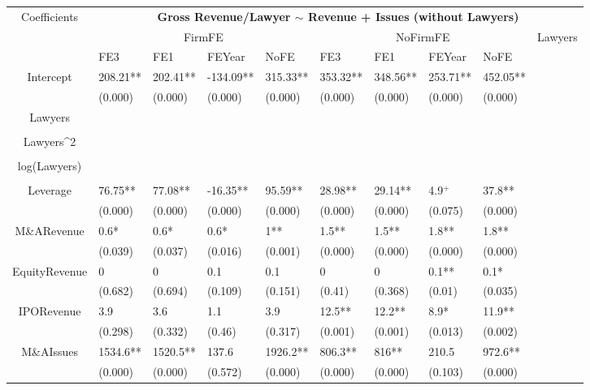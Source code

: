 \documentclass{article}
\begin{document}
\begin{table}[H]
\centering
\begin{tabular}{|clllllllll|}
\hline
\multirow{3}{*}{Coefficients} & \multicolumn{9}{c|}{\textbf{Gross Revenue/Lawyer $\sim$ Revenue + Issues (without Lawyers)}} \\
\cline{2-10}
& \multicolumn{4}{c}{FirmFE} & \multicolumn{4}{c}{NoFirmFE} & \multirow{2}{*}{Lawyers} \\
\cline{2-9}
& FE3 & FE1 & FEYear & NoFE & FE3 & FE1 & FEYear & NoFE &  \\
\hline
 
Intercept & 208.21** & 202.41** & -134.09** & 315.33** & 353.32** & 348.56** & 253.71** & 452.05** & \\ 
   & (0.000) & (0.000) & (0.000) & (0.000) & (0.000) & (0.000) & (0.000) & (0.000) & \\ 
  Lawyers &  &  &  &  &  &  &  &  & \\ 
   &  &  &  &  &  &  &  &  & \\ 
  Lawyers^2 &  &  &  &  &  &  &  &  & \\ 
   &  &  &  &  &  &  &  &  & \\ 
  log(Lawyers) &  &  &  &  &  &  &  &  & \\ 
   &  &  &  &  &  &  &  &  & \\ 
  Leverage & 76.75** & 77.08** & -16.35** & 95.59** & 28.98** & 29.14** & 4.9$^{+}$ & 37.8** & \\ 
   & (0.000) & (0.000) & (0.000) & (0.000) & (0.000) & (0.000) & (0.075) & (0.000) & \\ 
  M\&ARevenue & 0.6* & 0.6* & 0.6* & 1** & 1.5** & 1.5** & 1.8** & 1.8** & \\ 
   & (0.039) & (0.037) & (0.016) & (0.001) & (0.000) & (0.000) & (0.000) & (0.000) & \\ 
  EquityRevenue & 0 & 0 & 0.1 & 0.1 & 0 & 0 & 0.1** & 0.1* & \\ 
   & (0.682) & (0.694) & (0.109) & (0.151) & (0.41) & (0.368) & (0.01) & (0.035) & \\ 
  IPORevenue & 3.9 & 3.6 & 1.1 & 3.9 & 12.5** & 12.2** & 8.9* & 11.9** & \\ 
   & (0.298) & (0.332) & (0.46) & (0.317) & (0.001) & (0.001) & (0.013) & (0.002) & \\ 
  M\&AIssues & 1534.6** & 1520.5** & 137.6 & 1926.2** & 806.3** & 816** & 210.5 & 972.6** & \\ 
   & (0.000) & (0.000) & (0.572) & (0.000) & (0.000) & (0.000) & (0.103) & (0.000) & \\ 

\end{tabular}
\end{table}
\end{document}
